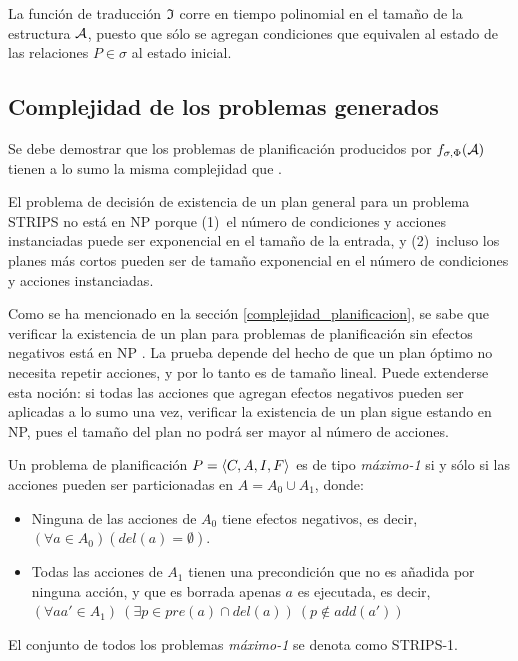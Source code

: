 La función de traducción $\mathfrak{I}$ corre en tiempo
polinomial en el tamaño de la estructura $\mathcal{A}$, puesto que sólo se agregan
condiciones que equivalen al estado de las relaciones $P\in\sigma$ al estado inicial.


\subsection{Complejidad de los problemas generados}
Se debe demostrar que los problemas de planificación producidos 
por $f_{\sigma,\Phi}(\mathcal{A})$ tienen a lo sumo la misma
complejidad que \SOE.

El problema de decisión de existencia de un plan general para un problema
STRIPS no está en NP porque (1)~el número de condiciones y acciones instanciadas puede ser
exponencial en el tamaño de la entrada, y (2)~incluso los planes más cortos pueden
ser de tamaño exponencial en el número de condiciones y acciones instanciadas.

Como se ha mencionado en la sección \ref{complejidad_planificacion}, 
se sabe que verificar la existencia de un plan para 
problemas de planificación
sin efectos negativos está en NP \citep{bylander:plan-complexity}. La prueba
depende del hecho de que un plan óptimo no necesita repetir acciones, y por lo
tanto es de tamaño lineal. Puede extenderse esta noción: si todas las acciones que
agregan efectos negativos pueden ser aplicadas a lo sumo una vez, verificar la
existencia de un plan sigue estando en NP, pues el tamaño del plan no podrá ser
mayor al número de acciones.

\begin{definition}
Un problema de planificación $P = \langle C, A, I, F \rangle$ es de tipo
\textit{máximo-1} si y sólo si las acciones pueden ser particionadas en $A =
A_0 \cup A_1$, donde:
\begin{itemize}
\item Ninguna de las acciones de $A_0$ tiene efectos negativos, es decir,
$(\forall a \in A_0) (del(a) = \emptyset)$.
\item Todas las acciones de $A_1$ tienen una precondición que no es añadida por
ninguna acción, y que es borrada apenas $a$ es ejecutada, es decir, 
$(\forall aa' \in A_1)\ (\exists p \in pre(a) \cap del(a))\ (p \not\in add(a'))$
\end{itemize}

El conjunto de todos los problemas \textit{máximo-1} se denota como STRIPS-1.
\end{definition}


